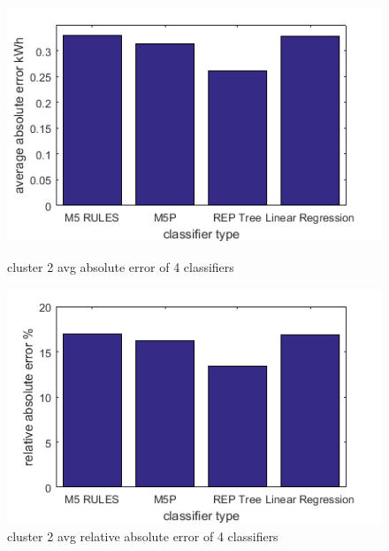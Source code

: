 \begin{figure}

\centering
\begin{minipage}{.5\textwidth}
  \centering
  \includegraphics[width=\linewidth]{cluster-2-diff-classifier-avg-abs.png}
  \caption{cluster 2 avg absolute error of 4 classifiers}
  \label{fig:cluster-2-predictors}
\end{minipage}%
\begin{minipage}{.5\textwidth}
  \centering
  \includegraphics[width=\linewidth]{cluster-2-diff-classifier-relative-abs.png}
  \caption{cluster 2 avg relative absolute error of 4 classifiers}
\end{minipage}


\end{figure}
